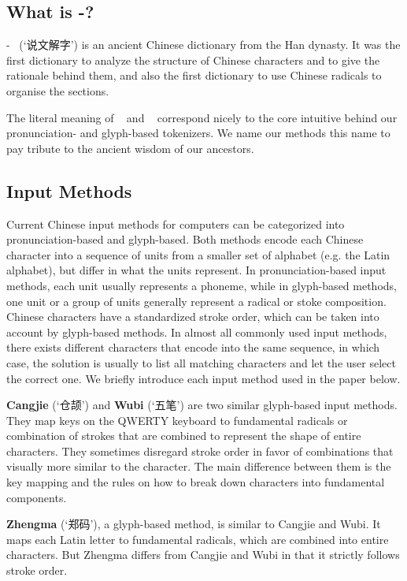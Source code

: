 \subsection{What is \shuowen-\jiezi?}
\label{app:shuowenjiezi}

\shuowen-\jiezi~ (`说文解字') is an ancient Chinese dictionary from the Han dynasty. 
It was the first dictionary to analyze the structure of Chinese characters and to give the rationale behind them, and also the first dictionary to use Chinese radicals to organise the sections.

The literal meaning of \shuowen~ and \jiezi~ correspond nicely to the core intuitive behind our pronunciation- and glyph-based tokenizers. We name our methods this name to pay tribute to the ancient wisdom of our ancestors. 

\subsection{Input Methods}
\label{app:inputmethod}

Current Chinese input methods for computers can be categorized into pronunciation-based and glyph-based. Both methods encode each Chinese character into a sequence of units from a smaller set of alphabet (e.g. the Latin alphabet), but differ in what the units represent. In pronunciation-based input methods, each unit usually represents a phoneme, while in glyph-based methods, one unit or a group of units generally represent a radical or stoke composition. Chinese characters have a standardized stroke order, which can be taken into account by glyph-based methods. In almost all commonly used input methods, there exists different characters that encode into the same sequence, in which case, the solution is usually to list all matching characters and let the user select the correct one. We briefly introduce each input method used in the paper below.

\noindent \textbf{Cangjie} (`仓颉') and \textbf{Wubi} (`五笔') are two similar glyph-based input methods. They map keys on the QWERTY keyboard to fundamental radicals or combination of strokes that are combined to represent the shape of entire characters. They sometimes disregard stroke order in favor of combinations that visually more similar to the character. The main difference between them is the key mapping and the rules on how to break down characters into fundamental components.

\noindent \textbf{Zhengma} (`郑码'), a glyph-based method, is similar to Cangjie and Wubi. It maps each Latin letter to fundamental radicals, which are combined into entire characters. But Zhengma differs from Cangjie and Wubi in that it strictly follows stroke order.

